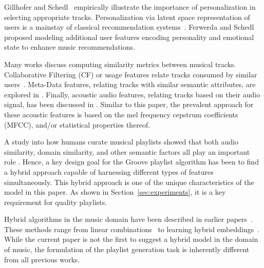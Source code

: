 Gillhofer and Schedl~\cite{Gillhofer2015} empirically illustrate the importance of personalization in selecting appropriate tracks. Personalization via latent space representation of users is a mainstay of classical recommendation systems~\cite{KorenBV09}. Ferwerda and Schedl~\cite{personalized_playlist_schedl} proposed modeling additional user features encoding personality and emotional state to enhance music recommendations.


Many works discuss computing similarity metrics between musical tracks. Collaborative Filtering (CF) or usage features relate tracks consumed by similar users~\cite{item2vec,Dror2011,Mcfee_learningsimilarity_CF}. Meta-Data features, relating tracks with similar semantic attributes, are explored in \cite{Bogdanov_content,  McfeeEtAl_2009_HeteEmbeForSubj, Pauws:ISMIR02,SlaneyEtAl_2008_LearAMetrFor}. Finally, acoustic audio features, relating tracks based on their audio signal, has been discussed in \cite{DoplerEtAl_2008_AcceMusiCollVia, Lee2011,a2mf}. Similar to this paper, the prevalent approach for these acoustic features is based on the mel frequency cepstrum coefficients (MFCC), and/or statistical properties thereof.

A study into how humans curate musical playlists showed that both audio similarity, domain similarity, and other semantic factors all play an important role \cite{Cunningham:06}. 
Hence, a key design goal for the Groove playlist algorithm has been to find a hybrid approach capable of harnessing different types of features simultaneously.
This hybrid approach is one of the unique characteristics of the model in this paper. As shown in Section~\ref{sec:experiments}, it is a key requirement for quality playlists.

Hybrid algorithms in the music domain have been described in earlier papers~\cite{Knees:2006, Mcfee_learningsimilarity_CF,McFee_multi_similarities,Schedl:2015}. These methods range from linear combinations~\cite{Knees:2006} to learning hybrid embeddings~\cite{McFee_multi_similarities}.
While the current paper is not the first to suggest a hybrid model in the domain of music, the formulation of the playlist generation task is inherently different from all previous works. 


